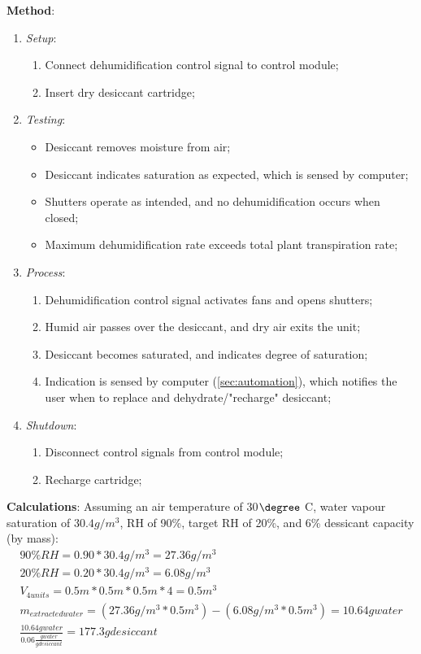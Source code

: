 \textbf{Method}:
\begin{enumerate}
    \item \textit{Setup}:
    \begin{enumerate}
        \item Connect dehumidification control signal to control module;
        \item Insert dry desiccant cartridge;
    \end{enumerate}
    \item \textit{Testing}:
    \begin{itemize}
        \item Desiccant removes moisture from air;
        \item Desiccant indicates saturation as expected, which is sensed by computer;
        \item Shutters operate as intended, and no dehumidification occurs when closed;
        \item Maximum dehumidification rate exceeds total plant transpiration rate;
    \end{itemize}
    \item \textit{Process}:
    \begin{enumerate}
        \item Dehumidification control signal activates fans and opens shutters;
        \item Humid air passes over the desiccant, and dry air exits the unit;
        \item Desiccant becomes saturated, and indicates degree of saturation;
        \item Indication is sensed by computer (\ref{sec:automation}), which notifies the user when to replace and dehydrate/"recharge" desiccant;
    \end{enumerate}
    \item \textit{Shutdown}:
    \begin{enumerate}
        \item Disconnect control signals from control module;
        \item Recharge cartridge;
    \end{enumerate}
\end{enumerate}

\textbf{Calculations}:
Assuming an air temperature of 30$\degree$ C, water vapour saturation of $30.4g/m^{3}$, RH of 90\%, target RH of 20\%, and 6\% dessicant capacity (by mass):
\vspace{.05cm}
\begin{gather}
    90\% RH = 0.90 * 30.4g/m^{3} = 27.36g/m^{3} \\
    20\% RH = 0.20 * 30.4g/m^{3} = 6.08g/m^{3} \\
    V_{4 units} = 0.5m * 0.5m * 0.5m * 4 = 0.5m^{3} \\
    m_{extracted water} = (27.36g/m^{3} * 0.5m^{3}) - (6.08g/m^{3} * 0.5m^{3}) = 10.64g water \\
    \frac{10.64g water}{0.06 \frac{g water}{g desiccant}} = 177.3g desiccant
\end{gather}

